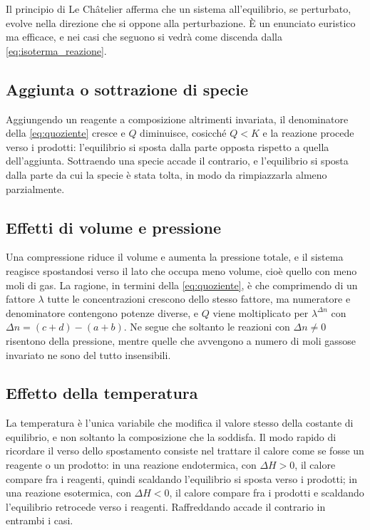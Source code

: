 Il principio di Le Châtelier afferma che un sistema all'equilibrio, se perturbato, evolve nella direzione che si oppone alla perturbazione.
È un enunciato euristico ma efficace, e nei casi che seguono si vedrà come discenda dalla \eqref{eq:isoterma_reazione}.

\subsection{Aggiunta o sottrazione di specie}

Aggiungendo un reagente a composizione altrimenti invariata, il denominatore della \eqref{eq:quoziente} cresce e $Q$ diminuisce, cosicché $Q < K$ e la reazione procede verso i prodotti: l'equilibrio si sposta dalla parte opposta rispetto a quella dell'aggiunta.
Sottraendo una specie accade il contrario, e l'equilibrio si sposta dalla parte da cui la specie è stata tolta, in modo da rimpiazzarla almeno parzialmente.

\subsection{Effetti di volume e pressione}

Una compressione riduce il volume e aumenta la pressione totale, e il sistema reagisce spostandosi verso il lato che occupa meno volume, cioè quello con meno moli di gas.
La ragione, in termini della \eqref{eq:quoziente}, è che comprimendo di un fattore $\lambda$ tutte le concentrazioni crescono dello stesso fattore, ma numeratore e denominatore contengono potenze diverse, e $Q$ viene moltiplicato per $\lambda^{\Delta n}$ con $\Delta n = (c+d) - (a+b)$.
Ne segue che soltanto le reazioni con $\Delta n \neq 0$ risentono della pressione, mentre quelle che avvengono a numero di moli gassose invariato ne sono del tutto insensibili.

\subsection{Effetto della temperatura}

La temperatura è l'unica variabile che modifica il valore stesso della costante di equilibrio, e non soltanto la composizione che la soddisfa.
Il modo rapido di ricordare il verso dello spostamento consiste nel trattare il calore come se fosse un reagente o un prodotto: in una reazione endotermica, con $\Delta H > 0$, il calore compare fra i reagenti, quindi scaldando l'equilibrio si sposta verso i prodotti; in una reazione esotermica, con $\Delta H < 0$, il calore compare fra i prodotti e scaldando l'equilibrio retrocede verso i reagenti.
Raffreddando accade il contrario in entrambi i casi.


